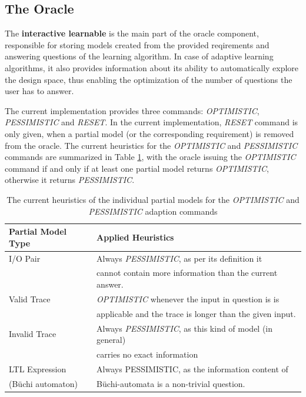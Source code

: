\subsection{The Oracle} \label{subsec_oracleimpl}
The \textbf{interactive learnable} is the main part of the oracle component, responsible for storing models created from the provided reqirements and answering questions of the learning algorithm. In case of adaptive learning algorithms, it also provides information about its ability to automatically explore the design space, thus enabling the optimization of the number of questions the user has to answer. 

The current implementation provides three commands: \textit{OPTIMISTIC}, \textit{PESSIMISTIC} and \textit{RESET}. In the current implementation, \textit{RESET} command is only given, when a partial model (or the corresponding requirement) is removed from the oracle. The current heuristics for the \textit{OPTIMISTIC} and \textit{PESSIMISTIC} commands are summarized in Table \ref{tab_implementedheuristics}, with the oracle issuing the \textit{OPTIMISTIC} command if and only if at least one partial model returns \textit{OPTIMISTIC}, otherwise it returns \textit{PESSIMISTIC}.

\begin{table}[ht]
	\footnotesize
	\centering
	\begin{tabular}{ l l }
		\toprule
		Partial Model Type & Applied Heuristics \\
		\midrule
		I/O Pair & Always \textit{PESSIMISTIC}, as per its definition it \\ &  cannot contain more information than the current answer. \\
		Valid Trace & \textit{OPTIMISTIC} whenever the input in question is is \\ & applicable and the trace is longer than the given input.  \\
		Invalid Trace & Always \textit{PESSIMISTIC}, as this kind of model (in general) \\ & carries no exact information \\
		LTL Expression  & Always PESSIMISTIC, as the information content of \\(Büchi automaton) & Büchi-automata is a non-trivial question. \\
		\bottomrule
	\end{tabular}
	\caption{The current heuristics of the individual partial models for the \textit{OPTIMISTIC} and \textit{PESSIMISTIC} adaption commands}
	\label{tab_implementedheuristics}
\end{table}

